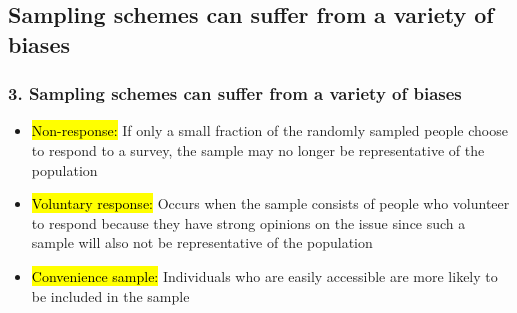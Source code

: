 \documentclass[11pt,containsverbatim,handout,xcolor=xelatex,dvipsnames,table]{beamer}
\begin{document}

\subsection{Sampling schemes can suffer from a variety of biases}
\label{mi3}


\begin{frame}
\frametitle{3. Sampling schemes can suffer from a variety of biases}

\begin{itemize}[<+->]

\item \hl{Non-response:} If only a small fraction of the randomly sampled people choose to respond to a survey, the sample may no longer be representative of the population

\item \hl{Voluntary response:} Occurs when the sample consists of people who volunteer to respond because they have strong opinions on the issue since such a sample will also not be representative of the population

\item \hl{Convenience sample:} Individuals who are easily accessible are more likely to be included in the sample

\end{itemize}

\end{frame}
\end{document}
